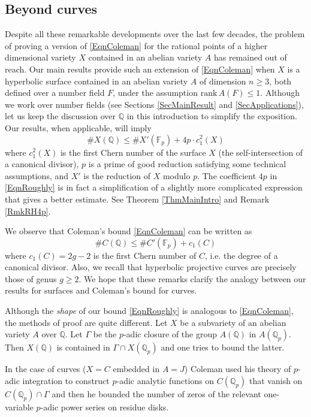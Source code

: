 \documentclass[11pt]{amsart}
\theoremstyle{remark}
\numberwithin{equation}{section}
\newcommand{\F}{\mathbb{F}}
\newcommand{\Q}{\mathbb{Q}}
\newcommand{\rk}{\mathrm{rank}\,}
\begin{document}

\subsection{Beyond curves} Despite all these remarkable developments over the last few decades, the problem of proving a version of \eqref{EqnColeman} for the rational points of a higher dimensional variety $X$ contained in an abelian variety $A$ has remained out of reach. Our main results provide such an extension of \eqref{EqnColeman} when $X$ is a hyperbolic surface contained in an abelian variety $A$ of dimension $n\ge 3$, both defined over a number field $F$, under the assumption $\rk A(F)\le 1$. Although we work over number fields (see Sections \ref{SecMainResult} and \ref{SecApplications}), let us keep the discussion over $\Q$ in this introduction to simplify the exposition. Our results, when applicable,  will imply
\begin{equation}\label{EqnRoughly}
\# X(\Q) \le \# X'(\F_p) + 4p\cdot c_1^2(X)
\end{equation}
where $c_1^2(X)$ is the first Chern number of the surface $X$ (the self-intersection of a canonical divisor),  $p$ is a prime of good reduction satisfying some technical assumptions, and  $X'$ is the reduction of $X$ modulo $p$. The coefficient $4p$ in \eqref{EqnRoughly} is in fact a simplification of a slightly more complicated expression that gives a better estimate. See  Theorem \ref{ThmMainIntro} and Remark \ref{RmkRH4p}. 

We observe that Coleman's bound \eqref{EqnColeman} can be written as
$$
\#C(\Q)\le  \#C'(\F_p) +c_1(C)
$$
where $c_1(C)=2g-2$ is the first Chern number of $C$, i.e. the degree of a canonical divisor. Also, we recall that hyperbolic projective curves are precisely those of genus $g\ge 2$. We hope that these remarks clarify the analogy between our results for surfaces and Coleman's bound for curves.

 Although the \emph{shape} of our bound \eqref{EqnRoughly} is analogous to \eqref{EqnColeman}, the methods of proof are quite different. Let $X$ be a subvariety of an abelian variety $A$ over $\Q$. Let  $\Gamma$ be the $p$-adic closure of the group $A(\Q)$ in $A(\Q_p)$. Then $X(\Q)$ is contained in  $\Gamma \cap X(\Q_p)$ and one tries to bound the latter.
 
 In the case of curves ($X=C$ embedded in $A=J$) Coleman used his theory of $p$-adic integration to construct $p$-adic analytic functions on $C(\Q_p)$ that vanish on $C(\Q_p)\cap \Gamma$ and then he bounded the number of zeros of the relevant one-variable $p$-adic power series on residue disks. 
\end{document}
